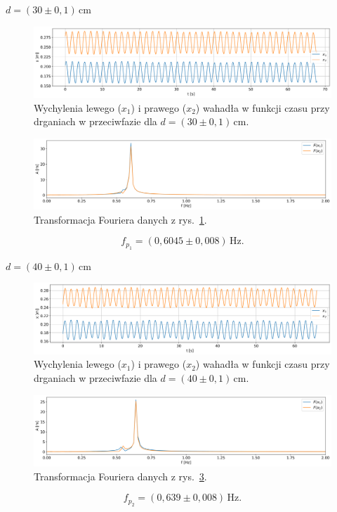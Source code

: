 \documentclass[12pt]{article}
\begin{document}
\(d = (30 \pm 0{,}1)\,\mathrm{cm}\)
\begin{figure}[H]
	\centering
	\includegraphics[width=\linewidth]{counterphase_1}
	\caption{Wychylenia lewego (\(x_1\)) i prawego (\(x_2\)) wahadła w funkcji czasu przy drganiach w przeciwfazie dla \(d = (30 \pm 0{,}1)\,\mathrm{cm}\).}
	\label{fig:counter_phase_0}
\end{figure}
\begin{figure}[H]
	\centering
	\includegraphics[width=\linewidth]{counterphase_1_fft}
	\caption{Transformacja Fouriera danych z rys.~\ref{fig:counter_phase_0}.}
	\label{fig:coutner_phase_0_fft}
\end{figure}
\[
	f_{p_1} = (0{,}6045 \pm 0{,}008)\,\mathrm{Hz}.
\]

\(d = (40 \pm 0{,}1)\,\mathrm{cm}\)
\begin{figure}[H]
	\centering
	\includegraphics[width=\linewidth]{counterphase_2}
	\caption{Wychylenia lewego (\(x_1\)) i prawego (\(x_2\)) wahadła w funkcji czasu przy drganiach w przeciwfazie dla \(d = (40 \pm 0{,}1)\,\mathrm{cm}\).}
	\label{fig:counter_phase_1}
\end{figure}
\begin{figure}[H]
	\centering
	\includegraphics[width=\linewidth]{counterphase_2_fft}
	\caption{Transformacja Fouriera danych z rys.~\ref{fig:counter_phase_1}.}
	\label{fig:coutner_phase_1_fft}
\end{figure}
\[
	f_{p_2} = (0{,}639 \pm 0{,}008)\,\mathrm{Hz}.
\]
\end{document}
